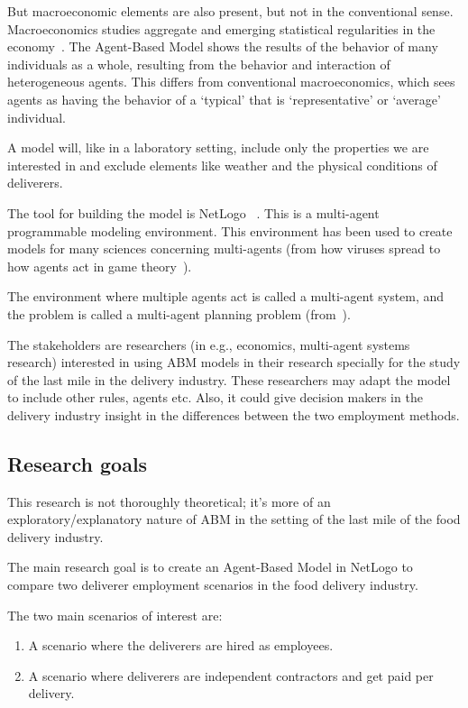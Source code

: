 But macroeconomic elements are also present, but not in the conventional sense.
Macroeconomics studies aggregate and emerging statistical regularities in the economy~\cite{cincotti2022we}.
The Agent-Based Model shows the results of the behavior of many individuals as a whole, resulting from the behavior and interaction of heterogeneous agents.
This differs from conventional macroeconomics, which sees agents as having the behavior of a `typical' that is `representative' or `average' individual.

A model will, like in a laboratory setting, include only the properties we are interested in and exclude elements like weather and the physical conditions of deliverers.

The tool for building the model is NetLogo ~\cite{NetLogo2024}.
This is a multi-agent programmable modeling environment.
This environment has been used to create models for many sciences concerning multi-agents (from how viruses spread to how agents act in game theory~\cite{r2019agent}).

The environment where multiple agents act is called a multi-agent system, and the problem is called a multi-agent planning problem (from~\cite{russell2016artificial}).

The stakeholders are researchers (in e.g., economics, multi-agent systems research) interested in using ABM models in their research specially for the study of the last mile in the delivery industry.
These researchers may adapt the model to include other rules, agents etc.
Also, it could give decision makers in the delivery industry insight in the differences between the two employment methods.

\subsection{Research goals}\label{subsec:research-goals}
This research is not thoroughly theoretical; it's more of an exploratory/explanatory nature of ABM in the setting of the last mile of the food delivery industry.

The main research goal is to create an Agent-Based Model in NetLogo to compare two deliverer employment scenarios in the food delivery industry.

The two main scenarios of interest are:
\begin{enumerate}
\item A scenario where the deliverers are hired as employees.
\item A scenario where deliverers are independent contractors and get paid per delivery.
\end{enumerate}


